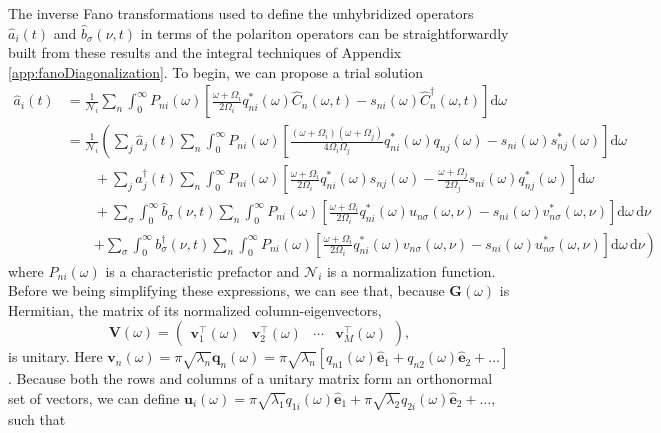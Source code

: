 The inverse Fano transformations used to define the unhybridized operators $\hat{a}_i(t)$ and $\hat{b}_\sigma(\nu,t)$ in terms of the polariton operators can be straightforwardly built from these results and the integral techniques of Appendix \ref{app:fanoDiagonalization}. To begin, we can propose a trial solution
\begin{equation}
\begin{split}
\hat{a}_i(t) &= \frac{1}{\mathcal{N}_i}\sum_n\int_0^\infty P_{ni}(\omega)\left[\frac{\omega + \Omega_i}{2\Omega_i}q_{ni}^*(\omega)\hat{C}_n(\omega,t) - s_{ni}(\omega)\hat{C}_{n}^\dagger(\omega,t)\right]\mathrm{d}\omega\\
&= \frac{1}{\mathcal{N}_i}\left(\sum_j\hat{a}_j(t)\sum_n\int_0^\infty P_{ni}(\omega)\left[\frac{(\omega + \Omega_i)(\omega + \Omega_j)}{4\Omega_i\Omega_j}q_{ni}^*(\omega)q_{nj}(\omega) - s_{ni}(\omega)s_{nj}^*(\omega)\right]\mathrm{d}\omega\right.\\
&\qquad + \sum_j\hat{a}_j^\dagger(t)\sum_n\int_0^\infty P_{ni}(\omega)\left[\frac{\omega + \Omega_i}{2\Omega_i}q_{ni}^*(\omega)s_{nj}(\omega) - \frac{\omega + \Omega_j}{2\Omega_j}s_{ni}(\omega)q_{nj}^*(\omega)\right]\mathrm{d}\omega\\
&\qquad + \sum_\sigma\int_0^\infty\hat{b}_\sigma(\nu,t)\sum_n\int_0^\infty P_{ni}(\omega)\left[\frac{\omega + \Omega_i}{2\Omega_i}q_{ni}^*(\omega)u_{n\sigma}(\omega,\nu) - s_{ni}(\omega)v_{n\sigma}^*(\omega,\nu)\right]\mathrm{d}\omega\,\mathrm{d}\nu\\
&\qquad\left. + \sum_\sigma\int_0^\infty b_\sigma^\dagger(\nu,t)\sum_n\int_0^\infty P_{ni}(\omega)\left[\frac{\omega + \Omega_i}{2\Omega_i}q_{ni}^*(\omega)v_{n\sigma}(\omega,\nu) - s_{ni}(\omega)u_{n\sigma}^*(\omega,\nu)\right]\mathrm{d}\omega\,\mathrm{d}\nu\right)
\end{split}
\end{equation}
where $P_{ni}(\omega)$ is a characteristic prefactor and $\mathcal{N}_i$ is a normalization function. Before we being simplifying these expressions, we can see that, because $\mathbf{G}(\omega)$ is Hermitian, the matrix of its normalized column-eigenvectors,
\begin{equation}
\mathbf{V}(\omega) =
\begin{pmatrix}
\mathbf{v}_1^\top(\omega) & \mathbf{v}_2^\top(\omega) & \cdots & \mathbf{v}_M^\top(\omega) 
\end{pmatrix},
\end{equation}
is unitary. Here $\mathbf{v}_n(\omega) = \pi\sqrt{\lambda_n}\mathbf{q}_n(\omega) = \pi\sqrt{\lambda_n}\left[q_{n1}(\omega)\hat{\mathbf{e}}_1 + q_{n2}(\omega)\hat{\mathbf{e}}_2 + \ldots\right]$. Because both the rows and columns of a unitary matrix form an orthonormal set of vectors, we can define $\mathbf{u}_i(\omega) = \pi\sqrt{\lambda_1}q_{1i}(\omega)\hat{\mathbf{e}}_{1} + \pi\sqrt{\lambda_{2}}q_{2i}(\omega)\hat{\mathbf{e}}_{2} + \ldots$, such that
